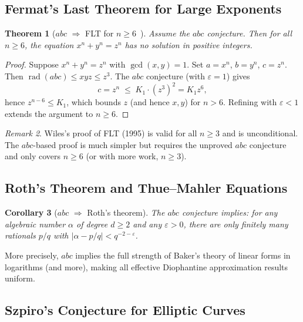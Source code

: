 \documentclass[12pt,a4paper]{article}
\newtheorem{theorem}{Theorem}[section]
\newtheorem{corollary}[theorem]{Corollary}
\theoremstyle{remark}
\newtheorem{remark}[theorem]{Remark}
\begin{document}
\subsection{Fermat's Last Theorem for Large Exponents}

\begin{theorem}[$abc$ $\Rightarrow$ FLT for $n \geq 6$~\cite{Granville1990}]
  Assume the $abc$ conjecture.  Then for all $n \geq 6$, the equation $x^n + y^n = z^n$
  has no solution in positive integers.
\end{theorem}

\begin{proof}[Proof]
  Suppose $x^n + y^n = z^n$ with $\gcd(x,y)=1$.  Set $a=x^n$, $b=y^n$, $c=z^n$.
  Then $\operatorname{rad}(abc) \leq xyz \leq z^3$.  The $abc$ conjecture (with
  $\varepsilon=1$) gives
  \[
    c = z^n \;\leq\; K_1 \cdot (z^3)^2 = K_1 z^6,
  \]
  hence $z^{n-6}\leq K_1$, which bounds $z$ (and hence $x,y$) for $n>6$.  Refining with
  $\varepsilon < 1$ extends the argument to $n\geq 6$.
\end{proof}

\begin{remark}
  Wiles's proof of FLT (1995) is valid for all $n\geq 3$ and is unconditional.
  The $abc$-based proof is much simpler but requires the unproved $abc$ conjecture and
  only covers $n\geq 6$ (or with more work, $n\geq 3$).
\end{remark}

\subsection{Roth's Theorem and Thue--Mahler Equations}

\begin{corollary}[$abc$ $\Rightarrow$ Roth's theorem]
  The $abc$ conjecture implies: for any algebraic number $\alpha$ of degree $d\geq 2$ and
  any $\varepsilon>0$, there are only finitely many rationals $p/q$ with
  $|\alpha - p/q| < q^{-2-\varepsilon}$.
\end{corollary}

More precisely, $abc$ implies the full strength of Baker's theory of linear forms in
logarithms (and more), making all effective Diophantine approximation results uniform.

\subsection{Szpiro's Conjecture for Elliptic Curves}
\end{document}

